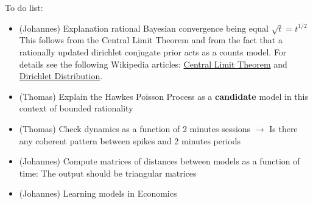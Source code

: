 To do list:
\begin{itemize}
\item (Johannes) Explanation rational Bayesian convergence being equal $\sqrt{t} = t^{1/2}$
\\
This follows from the Central Limit Theorem and from the fact that a rationally updated dirichlet conjugate prior acts as a counts model. For details see the following Wikipedia articles: \href{https://en.wikipedia.org/wiki/Central_limit_theorem}{Central Limit Theorem} and \href{https://en.wikipedia.org/wiki/Dirichlet_distribution}{Dirichlet Distribution}. 
\item (Thomas) Explain the Hawkes Poisson Process as a {\bf candidate} model in this context of bounded rationality
\item (Thomas) Check dynamics as a function of 2 minutes sessions $\rightarrow$ Is there any coherent pattern between spikes and 2 minutes periods
\item (Johannes) Compute  matrices of distances between models as a function of time: The output should be triangular matrices 
\item (Johannes) Learning models in Economics
\end{itemize}
  
  
  
  
  